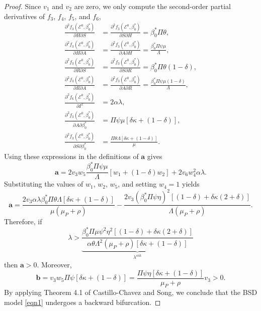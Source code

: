 \documentclass[11pt]{article}
\newcommand\bfa{\mathbf{a}}
\newcommand\bfb{\mathbf{b}}
\numberwithin{equation}{section}
\begin{document}
\begin{proof}
    Since $v_1$ and $v_2$ are zero, we only compute the second-order partial derivatives of $f_3$, $f_4$, $f_5$,  and $f_6$,
    \begin{align*}
        \frac{\partial^2f_3(\mathcal{E}^0,\beta_0^*)}{\partial H\partial S}&=\frac{\partial^2f_3(\mathcal{E}^0,\beta_0^*)}{\partial S\partial H}=\beta_0^*\Pi\theta,\\
        \frac{\partial^2f_3(\mathcal{E}^0,\beta_0^*)}{\partial H\partial A}&=\frac{\partial^2f_3(\mathcal{E}^0,\beta_0^*)}{\partial A\partial H}=\frac{\beta_0^*\Pi\psi\mu}{\Lambda},\\
        \frac{\partial^2f_3(\mathcal{E}^0,\beta_0^*)}{\partial R\partial S}&=\frac{\partial^2f_3(\mathcal{E}^0,\beta_0^*)}{\partial S\partial R}=\beta_0^*\Pi\theta(1-\delta),\\
        \frac{\partial^2f_3(\mathcal{E}^0,\beta_0^*)}{\partial R\partial A}&=\frac{\partial^2f_3(\mathcal{E}^0,\beta_0^*)}{\partial A\partial R}=\frac{\beta_0^*\Pi\psi\mu(1-\delta)}{\Lambda},\\
        \frac{\partial^2f_6(\mathcal{E}^0,\beta_0^*)}{\partial I^2}&=2\alpha\lambda,\\
        \frac{\partial^2f_3(\mathcal{E}^0,\beta_0^*)}{\partial A\partial\beta_0^*}&=\Pi\psi\mu[\delta\kappa+(1-\delta)],\\
        \frac{\partial^2f_3(\mathcal{E}^0,\beta_0^*)}{\partial S\partial\beta_0^*}&=\frac{\Pi\theta\Lambda[\delta\kappa+(1-\delta)]}{\mu}.
    \end{align*}
    Using these expressions in the definitions of $\bfa$ gives 
    \begin{equation}
        \bfa=2v_3w_5\frac{\beta_0^*\Pi\psi\mu}{\Lambda}\left[w_1+(1-\delta)w_2\right]+2v_6w_4^2\alpha\lambda.
    \end{equation}
    Substituting the values of $w_1$, $w_2$, $w_5$, and setting $w_4=1$ yields
    \begin{equation}
        \bfa=\frac{2v_3\alpha\lambda\beta_0^*\Pi\theta\Lambda[\delta\kappa+(1-\delta)]}{\mu(\mu_P+\rho)}-\frac{2v_3(\beta_0^*\Pi\psi\eta)^2[(1-\delta)+\delta\kappa(2+\delta)]}{\Lambda(\mu_P+\rho)}.
    \end{equation}
    Therefore, if 
    \begin{equation}\label{eqn12}
        \lambda>\underbrace{\frac{\beta_0^*\Pi\mu\psi^2\eta^2[(1-\delta)+\delta\kappa(2+\delta)]}{\alpha\theta\Lambda^2(\mu_P+\rho)[\delta\kappa+(1-\delta)]}}_{\lambda^{\text{crit}}}
    \end{equation}
    then $\bfa>0$. Moreover, 
    \begin{equation}
        \bfb=v_3w_5\Pi\psi[\delta\kappa+(1-\delta)]=\frac{\Pi\psi\eta[\delta\kappa+(1-\delta)]}{\mu_P+\rho}v_3>0.
    \end{equation}
    By applying Theorem 4.1 of Castillo-Chavez and Song, we conclude that the BSD model \eqref{eqn1} undergoes a backward bifurcation. 
    \end{proof}
    
\end{document}
